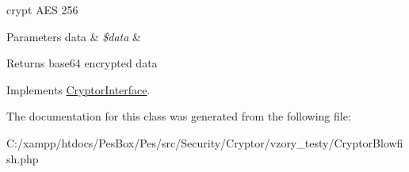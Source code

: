 crypt A\+ES 256


\begin{DoxyParams}[1]{Parameters}
data & {\em \$data} & \\
\hline
\end{DoxyParams}
\begin{DoxyReturn}{Returns}
base64 encrypted data 
\end{DoxyReturn}


Implements \mbox{\hyperlink{interface_pes_1_1_security_1_1_cryptor_1_1_cryptor_interface}{Cryptor\+Interface}}.



The documentation for this class was generated from the following file\+:\begin{DoxyCompactItemize}
\item 
C\+:/xampp/htdocs/\+Pes\+Box/\+Pes/src/\+Security/\+Cryptor/vzory\+\_\+testy/Cryptor\+Blowfish.\+php\end{DoxyCompactItemize}
